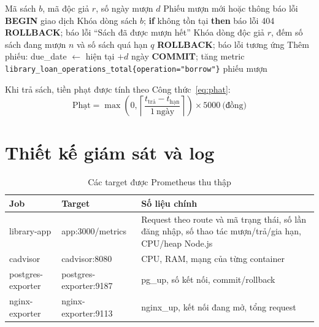 \documentclass[../main.tex]{subfiles}
\begin{document}
\begin{algorithm}[H]
\caption{Lập phiếu mượn sách}
\label{alg:muon-sach}
\begin{algorithmic}[1]
\Require Mã sách $b$, mã độc giả $r$, số ngày mượn $d$
\Ensure Phiếu mượn mới hoặc thông báo lỗi
\State \textbf{BEGIN} giao dịch
\State Khóa dòng sách $b$; \textbf{if} không tồn tại \textbf{then} báo lỗi 404
    \State \textbf{ROLLBACK}; báo lỗi ``Sách đã được mượn hết''
\EndIf
\State Khóa dòng độc giả $r$, đếm số sách đang mượn $n$ và số sách quá hạn $q$
    \State \textbf{ROLLBACK}; báo lỗi tương ứng
\EndIf
\State Thêm phiếu: due\_date $\gets$ hiện tại $+ d$ ngày
\State \textbf{COMMIT}; tăng metric \texttt{library\_loan\_operations\_total\{operation="borrow"\}}
\State \Return phiếu mượn
\end{algorithmic}
\end{algorithm}

Khi trả sách, tiền phạt được tính theo Công thức~\ref{eq:phat}:
\begin{equation}
\text{Phạt} = \max\left(0, \left\lceil \frac{t_{\text{trả}} - t_{\text{hạn}}}{1\ \text{ngày}} \right\rceil\right) \times 5000\ \text{(đồng)}
\label{eq:phat}
\end{equation}

\section{Thiết kế giám sát và log}
\begin{table}[H]
\centering
\caption{Các target được Prometheus thu thập}
\label{tab:targets}
\begin{tabular}{|p{3.4cm}|p{3.6cm}|p{7.2cm}|}
\hline
\textbf{Job} & \textbf{Target} & \textbf{Số liệu chính} \\
\hline
library-app & app:3000/metrics & Request theo route và mã trạng thái, số lần đăng nhập, số thao tác mượn/trả/gia hạn, CPU/heap Node.js \\ \hline
cadvisor & cadvisor:8080 & CPU, RAM, mạng của từng container \\ \hline
postgres-exporter & postgres-exporter:9187 & pg\_up, số kết nối, commit/rollback \\ \hline
nginx-exporter & nginx-exporter:9113 & nginx\_up, kết nối đang mở, tổng request \\ \hline
\end{tabular}
\end{table}
\end{document}
